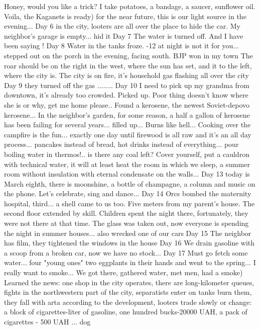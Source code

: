 Honey, would you like a trick?
I take potatoes, a bandage, a saucer, sunflower oil. Voila, the Kaganets is ready) for the near future, this is our light source in the evening...
Day 6 in the city, looters are all over the place to hide the car. My neighbor's garage is empty... hid it
Day 7
The water is turned off. And I have been saying !
Day 8
Water in the tanks froze. -12 at night is not it for you... stepped out on the porch in the evening, facing south. BJP won in my town The roar should be on the right in the west, where the sun has set, and it to the left, where the city is. The city is on fire, it's household gas flashing all over the city
Day 9
they turned off the gas ........
Day 10
I need to pick up my grandma from downtown, it's already too crowded. Picked up. Poor thing doesn't know where she is or why, get me home please..
Found a kerosene, the newest Soviet-depovo kerosene... In the neighbor's garden, for some reason, a half a gallon of kerosene has been failing for several years... filled up... Burns like hell...
Cooking over the campfire is the fun... exactly one day until firewood is all raw and it's an all day process... pancakes instead of bread, hot drinks instead of everything... pour boiling water in thermos!.. is there any coal left? Cover yourself, put a cauldron with technical water, it will at least heat the room in which we sleep, a summer room without insulation with eternal condensate on the walls...
Day 13
today is March eighth, there is moonshine, a bottle of champagne, a column and music on the phone. Let's celebrate, sing and dance...
Day 14
Orcs bombed the maternity hospital, third... a shell came to us too. Five meters from my parent's house. The second floor extended by skill. Children spent the night there, fortunately, they were not there at that time. The glass was taken out, now everyone is spending the night in summer houses... also wrecked one of our cars
Day 15
The neighbor has film, they tightened the windows in the house
Day 16
We drain gasoline with a scoop from a broken car, now we have no stock...
Day 17
Must go fetch some water... four "young ones" two eggplants in their hands and went to the spring... I really want to smoke...
We got there, gathered water, met men, had a smoke)
Learned the news: one shop in the city operates, there are long-kilometer queues, fights in the northwestern part of the city, separatists enter on tanks burn them, they fall with arta according to the development, looters trade slowly or change: a block of cigarettes-liter of gasoline, one hundred bucks-20000 UAH, a pack of cigarettes - 500 UAH ... dog
